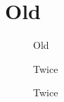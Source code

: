\section{Old}\label{sec:old}
\begin{figure}\caption{Old}\label{fig:only-old}\end{figure}
\begin{figure}\caption{Twice}\label{fig:twice}\end{figure}
\begin{figure}\caption{Twice}\label{fig:twice}\end{figure}
